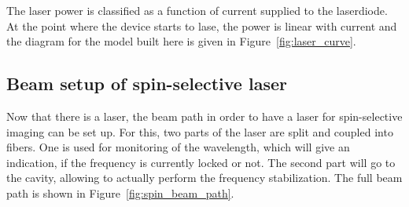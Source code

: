 The laser power is classified as a function of current supplied to the laserdiode. At the point where the device starts to lase, the power is linear with current and the diagram for the model built here is given in Figure~\ref{fig:laser_curve}.


\begin{figure}[t]%
\end{figure}

\subsection{Beam setup of spin-selective laser}

Now that there is a laser, the beam path in order to have a laser for spin-selective imaging can be set up. For this, two parts of the laser are split and coupled into fibers. One is used for monitoring of the wavelength, which will give an indication, if the frequency is currently locked or not. The second part will go to the cavity, allowing to actually perform the frequency stabilization. The full beam path is shown in Figure~\ref{fig:spin_beam_path}.

\begin{figure}[t]%
\end{figure}

